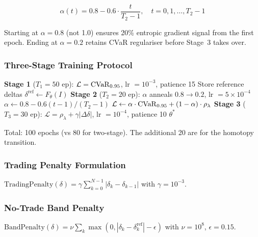 \begin{equation}
    \alpha(t) = 0.8 - 0.6 \cdot \frac{t}{T_2 - 1}, \quad t = 0, 1, \ldots, T_2 - 1
\end{equation}

Starting at $\alpha=0.8$ (not 1.0) ensures 20\% entropic gradient signal from the first epoch. Ending at $\alpha=0.2$ retains CVaR regulariser before Stage~3 takes over.

\subsubsection{Three-Stage Training Protocol}

\begin{algorithm}[H]
\caption{Three-Stage Curriculum Hedger (3SCH)}
\begin{algorithmic}[1]
\STATE \textbf{Stage 1} ($T_1 = 50$ ep): $\mathcal{L} = \mathrm{CVaR}_{0.95}$, lr $= 10^{-3}$, patience 15
\STATE Store reference deltas $\delta^{\text{ref}} \gets F_\theta(I)$
\STATE \textbf{Stage 2} ($T_2 = 20$ ep): $\alpha$ anneals $0.8 \to 0.2$, lr $= 5 \times 10^{-4}$
    \STATE $\alpha \gets 0.8 - 0.6(t-1)/(T_2 - 1)$
    \STATE $\mathcal{L} \gets \alpha \cdot \mathrm{CVaR}_{0.95} + (1-\alpha) \cdot \rho_\lambda$
\ENDFOR
\STATE \textbf{Stage 3} ($T_3 = 30$ ep): $\mathcal{L} = \rho_\lambda + \gamma|\Delta\delta|$, lr $= 10^{-4}$, patience 10
\RETURN $\theta^*$
\end{algorithmic}
\end{algorithm}

Total: 100 epochs (vs 80 for two-stage). The additional 20 are for the homotopy transition.



\subsubsection{Trading Penalty Formulation}

\begin{definition}
$\mathrm{TradingPenalty}(\delta) = \gamma \sum_{k=0}^{N-1} |\delta_k - \delta_{k-1}|$ with $\gamma = 10^{-3}$.
\end{definition}

\subsubsection{No-Trade Band Penalty}

\begin{definition}
$\mathrm{BandPenalty}(\delta) = \nu \sum_k \max(0, |\delta_k - \delta_k^{\text{ref}}| - \epsilon)$ with $\nu = 10^8$, $\epsilon = 0.15$.
\end{definition}

